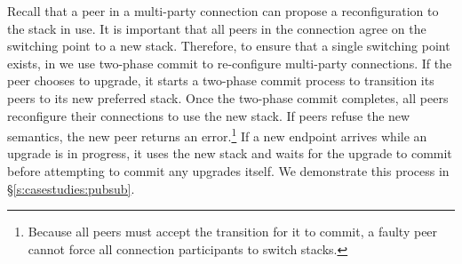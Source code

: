 Recall that a peer in a multi-party connection can propose a reconfiguration to the \tunnel stack in use.
It is important that all peers in the connection agree on the switching point to a new \tunnel stack. Therefore, to ensure that a single switching point exists, in \name we use two-phase commit to re-configure multi-party connections. 
If the peer chooses to upgrade, it starts a two-phase commit process to transition its peers to its new preferred stack. Once the two-phase commit completes, all peers reconfigure their connections to use the new stack.
If peers refuse the new semantics, the new peer returns an error.\footnote{Because all peers must accept the transition for it to commit, a faulty peer cannot force all connection participants to switch stacks.}
If a new endpoint arrives while an upgrade is in progress, it uses the new stack and waits for the upgrade to commit before attempting to commit any upgrades itself.
We demonstrate this process in \S\ref{s:casestudies:pubsub}.

